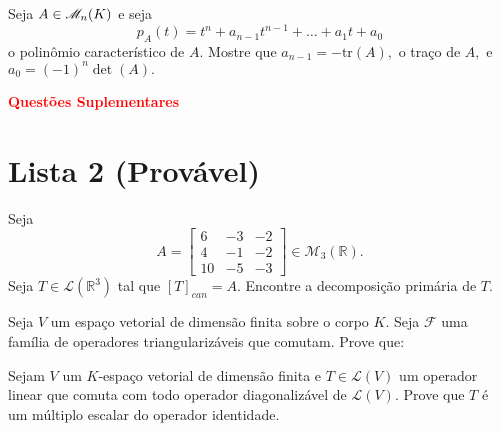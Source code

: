 \documentclass[11pt,a4paper]{article}
\begin{document}
       \solucao{}
   
     Seja $A \in \mathcal{M}_{n}(K)$ e seja 
    \[p_A(t) = t^n + a_{n−1}t^{n−1} + \ldots + a_1t + a_0\] o polinômio característico de $A.$ Mostre que $a_{n−1} = − \mbox{tr}(A),$ o traço de $A,$ e $a_0 = (−1)^n \det(A).$
    
  \solucao{}
   
   
  \textbf{\textcolor{Red}{Questões Suplementares}}



\newpage
\section{\textcolor{Floresta}{Lista 2 (Provável)}}

 Seja
\[
A = \begin{bmatrix} 6 & -3 & -2 \\
4 & -1 & -2 \\
10 & -5 & -3 
\end{bmatrix} \in \mathcal{M}_3(\mathbb{R}).
\]
Seja $T \in \mathcal{L}(\mathbb{R}^3)$ tal que $[T]_{can} = A.$ Encontre a decomposição primária de $T.$
  \solucao{}
  
   Seja $V$ um espaço vetorial de dimensão finita sobre o corpo $K.$ Seja $\mathcal{F}$ uma família de operadores triangularizáveis que comutam. Prove que:
 
   \solucao{}
  
   Sejam $V$ um $K$-espaço vetorial de dimensão finita e $T \in \mathcal{L}(V)$ um operador linear que comuta com todo operador diagonalizável de $\mathcal{L}(V).$ Prove que $T$ é um múltiplo escalar do operador identidade.
  
\end{document}
